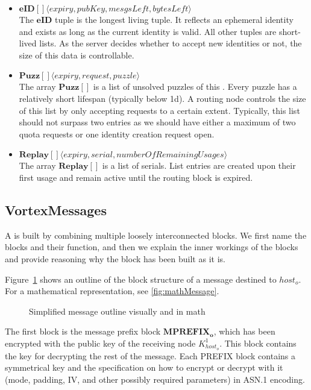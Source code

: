 \begin{itemize}
	\item $\mathbf{eID[]}\langle expiry, pubKey, mesgsLeft, bytesLeft \rangle$\\
	The $\mathbf{eID}$ tuple is the longest living tuple. It reflects an ephemeral identity and exists as long as the current identity is valid. All other tuples are short-lived lists. As the server decides whether to accept new identities or not, the size of this data is controllable. 
	\item $\mathbf{Puzz[]}\langle expiry, request, puzzle \rangle$\\
	The array $\mathbf{Puzz[]}$ is a list of unsolved puzzles of this . Every puzzle has a relatively short lifespan (typically below 1d). A routing node controls the size of this list by only accepting requests to a certain extent. Typically, this list should not surpass two entries as we should have either a maximum of two quota requests or one identity creation request open.
	\item $\mathbf{Replay[]}\langle expiry, serial, numberOfRemainingUsages \rangle$\\
	The array $\mathbf{Replay[]}$ is a list of serials. List entries are created upon their first usage and remain active until the routing block is expired. 
\end{itemize}


\subsection{VortexMessages}\label{sec:vortexMessage}
A \VortexMessage{} is built by combining multiple loosely interconnected blocks. We first name the blocks and their function, and then we explain the inner workings of the blocks and provide reasoning why the block has been built as it is. 

Figure~\ref{fig:messageOutline} shows an outline of the block structure of a message destined to $host_o$. For a mathematical representation, see \cref{fig:mathMessage}.

\begin{figure}[ht]
	\centering\resizebox{.95\linewidth}{!}{
		
	}
	\caption{Simplified message outline visually and in math}
	\label{fig:messageOutline}
\end{figure}

The first block is the message prefix block $\mathbf{MPREFIX_o}$, which has been encrypted with the public key of the receiving node $K^1_{host_o}$. This block contains the key for decrypting the rest of the message. Each PREFIX block contains a symmetrical key and the specification on how to encrypt or decrypt with it (mode, padding, IV, and other possibly required parameters) in ASN.1 encoding. 

